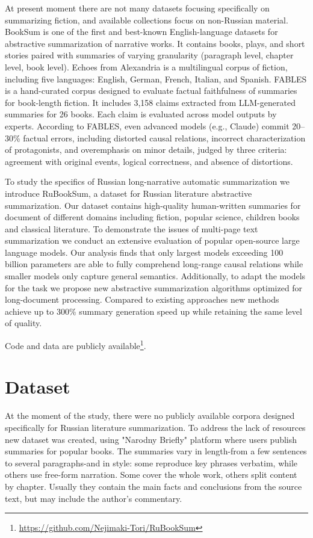 \documentclass{superfri}
\begin{document}
At present moment there are not many datasets focusing specifically on summarizing fiction, and available collections focus on non-Russian material.
BookSum \cite{BookSum} is one of the first and best-known English-language datasets for abstractive summarization of narrative works. 
It contains books, plays, and short stories paired with summaries of varying granularity (paragraph level, chapter level, book level).
Echoes from Alexandria \cite{alexandria} is a multilingual corpus of fiction, including five languages: English, German, French, Italian, and Spanish.
FABLES \cite{fables} is a hand-curated corpus designed to evaluate factual faithfulness of summaries for book-length fiction.
It includes 3,158 claims extracted from LLM-generated summaries for 26 books.
Each claim is evaluated across model outputs by experts.
According to FABLES, even advanced models (e.g., Claude) commit 20–30\% factual errors, including distorted
causal relations, incorrect characterization of protagonists, and overemphasis on minor details,
judged by three criteria: agreement with original events, logical correctness, and absence of distortions.

To study the specifics of  Russian long-narrative automatic summarization we introduce RuBookSum, a dataset for Russian literature abstractive summarization. 
Our dataset contains high-quality human-written summaries for document of different domains including fiction, popular science, children books and classical literature.
To demonstrate the issues of multi-page text summarization we conduct an extensive evaluation of popular open-source large language models. 
Our analysis finds that only largest models exceeding 100 billion parameters are able to fully comprehend long-range causal relations while smaller models 
only capture general semantics. Additionally, to adapt the models for the task we propose new abstractive summarization algorithms optimized for long-document processing. 
Compared to existing approaches new methods achieve up to 300\% summary generation speed up while retaining the same level of quality.

Code and data are publicly available\footnote{\label{git}\url{https://github.com/Nejimaki-Tori/RuBookSum}}.


\section{Dataset}
At the moment of the study, there were no publicly available corpora designed specifically for Russian literature summarization.
To address the lack of resources new dataset was created, using "Narodny Briefly" platform \cite{Briefly} where users publish summaries for popular books.
The summaries vary in length-from a few sentences to several paragraphs-and in style: some reproduce key phrases verbatim, 
while others use free-form narration. Some cover the whole work, others split content by chapter.
Usually they contain the main facts and conclusions from the source text, but may include the author’s commentary.
\end{document}
